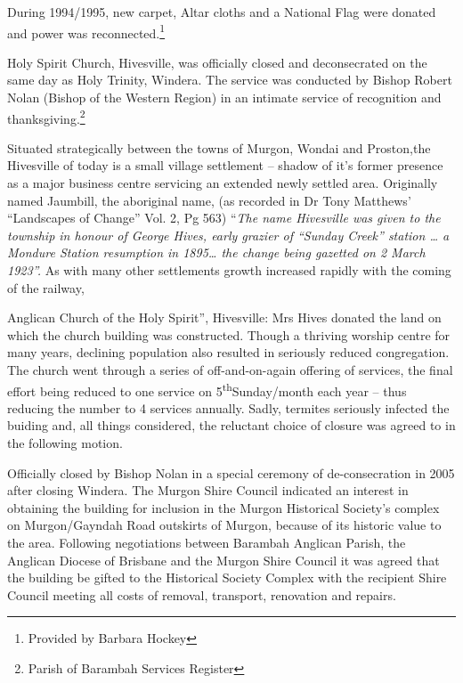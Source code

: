 During 1994/1995, new carpet, Altar cloths and a National Flag were donated and power was reconnected.\footnote{Provided by Barbara Hockey}


Holy Spirit Church, Hivesville, was officially closed and deconsecrated on the same day as Holy Trinity, Windera. The service was conducted by Bishop Robert Nolan (Bishop of the Western Region) in an intimate service of recognition and thanksgiving.\footnote{Parish of Barambah Services Register}


Situated strategically between the towns of Murgon, Wondai and Proston,the Hivesville of today is a small village settlement -- shadow of it's former presence as a major business centre servicing an extended newly settled area. Originally named Jaumbill, the aboriginal name, (as recorded in Dr Tony Matthews' ``Landscapes of Change'' Vol. 2, Pg 563) ``\emph{The name Hivesville was given to the township in honour of George Hives, early grazier of ``Sunday Creek'' station \ldots{} a Mondure Station resumption in 1895\ldots{} the change being gazetted on 2 March 1923''.} As with many other settlements growth increased rapidly with the coming of the railway,



Anglican Church of the Holy Spirit'', Hivesville: Mrs Hives donated the land on which the church building was constructed. Though a thriving worship centre for many years, declining population also resulted in seriously reduced congregation. The church went through a series of off-and-on-again offering of services, the final effort being reduced to one service on 5\textsuperscript{th}Sunday/month each year -- thus reducing the number to 4 services annually. Sadly, termites seriously infected the buiding and, all things considered, the reluctant choice of closure was agreed to in the following motion.



Officially closed by Bishop Nolan in a special ceremony of de-consecration in 2005 after closing Windera. The Murgon Shire Council indicated an interest in obtaining the building for inclusion in the Murgon Historical Society's complex on Murgon/Gayndah Road outskirts of Murgon, because of its historic value to the area. Following negotiations between Barambah Anglican Parish, the Anglican Diocese of Brisbane and the Murgon Shire Council it was agreed that the building be gifted to the Historical Society Complex with the recipient Shire Council meeting all costs of removal, transport, renovation and repairs.



